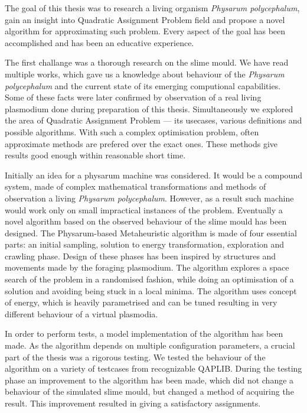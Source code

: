 \documentclass[english,a4paper,twoside]{ppfcmthesis}
\begin{document}
The goal of this thesis was to research a living organism \textit{Physarum polycephalum}, gain an insight into Quadratic Assignment Problem field and propose a novel algorithm for approximating such problem. Every aspect of the goal has been accomplished and has been an educative experience.

The first challange was a thorough research on the slime mould. We have read multiple works, which gave us a knowledge about behaviour of the \textit{Physarum polycephalum} and the current state of its emerging computional capabilities. Some of these facts were later confirmed by observation of a real living plasmodium done during preparation of this thesis. Simultaneously we explored the area of Quadratic Assignment Problem --- its usecases, various definitions and possible algorithms. With such a complex optimisation problem, often approximate methods are prefered over the exact ones. These methods give results good enough within reasonable short time.

Initially an idea for a physarum machine was considered. It would be a compound system, made of complex mathematical transformations and methods of observation a living \textit{Physarum polycephalum}. However, as a result such machine would work only on small impractical instances of the problem. Eventually a novel algorithm based on the observed behaviour of the slime mould has been designed. The Physarum-based Metaheuristic algorithm is made of four essential parts: an initial sampling, solution to energy transformation, exploration and crawling phase. Design of these phases has been inspired by structures and movements made by the foraging plasmodium. The algorithm explores a space search of the problem in a randomised fashion, while doing an optimisation of a solution and avoiding being stuck in a local minima. The algorithm uses concept of energy, which is heavily parametrised and can be tuned resulting in very different behaviour of a virtual plasmodia.

In order to perform tests, a model implementation of the algorithm has been made. As the algorithm depends on multiple configuration parameters, a crucial part of the thesis was a rigorous testing. We tested the behaviour of the algorithm on a variety of testcases from recognizable QAPLIB. During the testing phase an improvement to the algorithm has been made, which did not change a behaviour of the simulated slime mould, but changed a method of acquiring the result. This improvement resulted in giving a satisfactory assignments.
\end{document}
